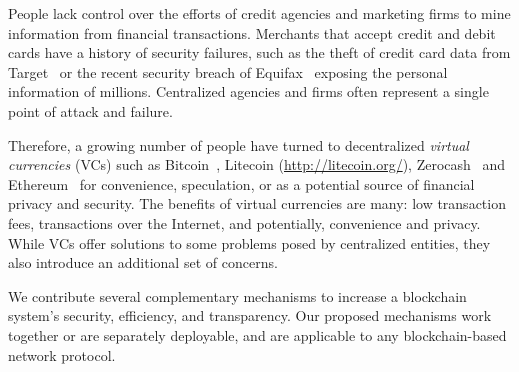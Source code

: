 People lack control over the
efforts of credit agencies and marketing firms to mine information
from financial transactions. Merchants that accept
credit and debit cards have a history of security  
failures, such as the theft of credit card data from Target~\cite{harris:2014,perlroth:2013} or the recent security breach of Equifax~\cite{equifax} exposing the personal information of millions. Centralized agencies and firms often represent a single point of attack and
 failure.

Therefore, a growing number of people have turned to decentralized {\em virtual
currencies} (VCs) such as Bitcoin~\cite{Nakamoto:2009},
Litecoin (\url{http://litecoin.org/}), Zerocash~\cite{sasson:2014} and Ethereum~\cite{ETHASH} for convenience, speculation, 
or as a potential source of financial privacy and security. The benefits of virtual currencies are many: low transaction
fees, transactions over the Internet, and potentially, convenience and
privacy. While VCs offer solutions to some problems posed by centralized entities, they also introduce an additional set of concerns.

We contribute several complementary mechanisms to increase a blockchain system's security, efficiency, and transparency. Our proposed mechanisms work together or are separately deployable, and are applicable to any blockchain-based network protocol.


